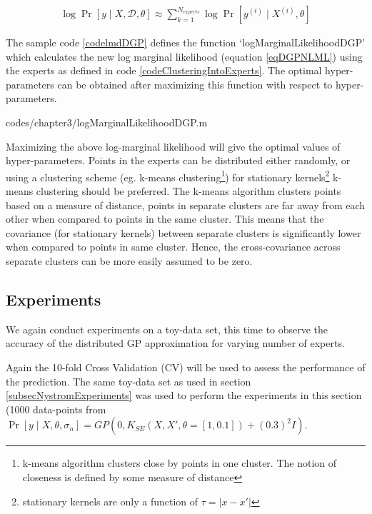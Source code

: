 \begin{align}\label{eqDGPNLML}
    \log \Pr[y \mid X, \mathcal{D}, \theta] \approx \sum_{k=1}^{N_{experts}} \log \Pr[y^{(i)}\mid X^{(i)}, \theta]
 \end{align}

The sample code \ref{codelmdDGP} defines the function `logMarginalLikelihoodDGP' which calculates the new log marginal likelihood (equation \ref{eqDGPNLML}) using the experts as defined in code \ref{codeClusteringIntoExperts}. The optimal hyper-parameters can be obtained after maximizing this function with respect to hyper-parameters. 

\begin{mdframed}[hidealllines=true,backgroundcolor=lightgray!20]

                    {codes/chapter3/logMarginalLikelihoodDGP.m}
\end{mdframed}

Maximizing the above log-marginal likelihood will give the optimal values of hyper-parameters. Points in the experts can be distributed either randomly, or using a clustering scheme (eg. k-means clustering\footnote{k-means algorithm clusters close by points in one cluster. The notion of closeness is defined by some measure of distance}) for stationary kernels\footnote{stationary kernels are only a function of $\tau = |x-x'|$} k-means clustering should be preferred. The k-means algorithm clusters points based on a measure of distance, points in separate clusters are far away from each other when compared to points in the same cluster. This means that the covariance (for stationary kernels) between separate clusters is significantly lower when compared to points in same cluster. Hence, the cross-covariance across separate clusters can be more easily assumed to be zero.

\subsection{Experiments}\label{subSecDistributedExperiments}
We again conduct experiments on a toy-data set, this time to observe the accuracy of the distributed GP approximation for varying number of experts. 

Again the 10-fold Cross Validation (CV) will be used to assess the performance of the prediction. The same toy-data set as used in section \ref{subsecNystromExperiments} was used to perform the experiments in this section (1000 data-points from $\Pr[y \mid X, \theta, \sigma_{n}] = GP(0, K_{SE}(X, X', \theta = [1, 0.1]) + (0.3)^{2}I)$.

